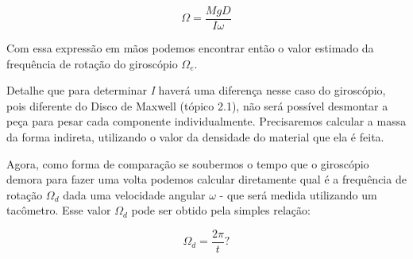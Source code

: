 \[ \Omega = \frac{MgD}{I \omega} \]

Com essa expressão em mãos podemos encontrar então o valor estimado da frequência de rotação do giroscópio $\Omega _e$.

Detalhe que para determinar \textit{I} haverá uma diferença nesse caso do giroscópio, pois diferente do Disco de Maxwell (tópico 2.1), não será possível desmontar a peça para pesar cada componente individualmente. Precisaremos calcular a massa da forma indireta, utilizando o valor da densidade do material que ela é feita.

Agora, como forma de comparação se soubermos o tempo que o giroscópio demora para fazer uma volta podemos calcular diretamente qual é a frequência de rotação $\Omega _d$ dada uma velocidade angular $\omega$ - que será medida utilizando um tacômetro. Esse valor $\Omega _d$ pode ser obtido pela simples relação:

\[ \Omega _d = \frac{2\pi}{t} ? \]
